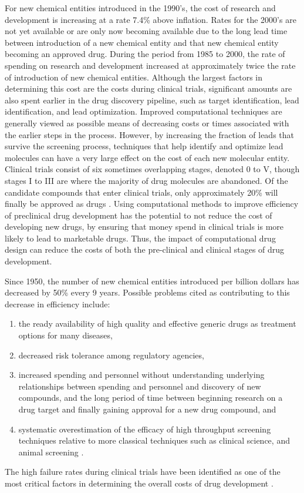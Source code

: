 For new chemical entities introduced in the 1990's, the cost of research and development is increasing at a rate 7.4\% above inflation.
Rates for the 2000's are not yet available or are only now becoming available due to the long lead time between introduction of a new chemical entity and that new chemical entity becoming an approved drug.
During the period from 1985 to 2000, the rate of spending on research and development increased at approximately twice the rate of introduction of new chemical entities.
Although the largest factors in determining this cost are the costs during clinical trials, significant amounts are also spent earlier in the drug discovery pipeline, such as target identification, lead identification, and lead optimization.
Improved computational techniques are generally viewed as possible means of decreasing costs or times associated with the earlier steps in the process.
However, by increasing the fraction of leads that survive the screening process, techniques that help identify and optimize lead molecules can have a very large effect on the cost of each new molecular entity.
Clinical trials consist of six sometimes overlapping stages, denoted 0 to V, though stages I to III are where the majority of drug molecules are abandoned.
Of the candidate compounds that enter clinical trials, only approximately 20\% will finally be approved as drugs \cite{dimasi2003price}.
Using computational methods to improve efficiency of preclinical drug development has the potential to not reduce the cost of developing new drugs, by ensuring that money spend in clinical trials is more likely to lead to marketable drugs.
Thus, the impact of computational drug design can reduce the costs of both the pre-clinical and clinical stages of drug development.  

Since 1950, the number of new chemical entities introduced per billion dollars has decreased by 50\% every 9 years.
Possible problems cited as contributing to this decrease in efficiency include:
\begin{enumerate}
 \item the ready availability of high quality and effective generic drugs as treatment options for many diseases,
 \item decreased risk tolerance among regulatory agencies,
 \item increased spending and personnel without understanding underlying relationships between spending and personnel and discovery of new compounds, and the long period of time between beginning research on a drug target and finally gaining approval for a new drug compound, and
 \item systematic overestimation of the efficacy of high throughput screening techniques relative to more classical techniques such as clinical science, and animal screening \cite{scannell2012diagnosing}.
\end{enumerate}

The high failure rates during clinical trials have been identified as one of the most critical factors in determining the overall costs of drug development \cite{bleicher2003hit}.

